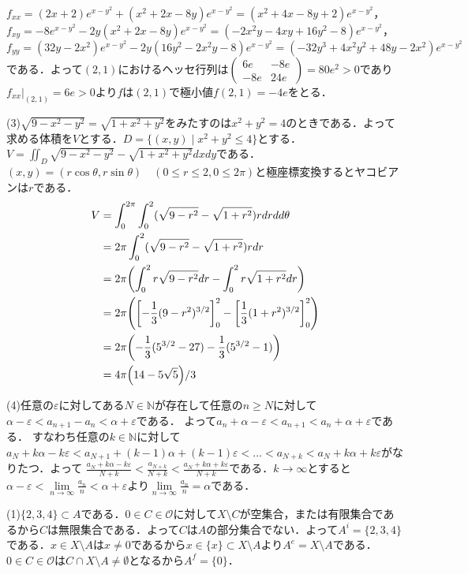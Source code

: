 \documentclass[
		book,
		head_space=20mm,
		foot_space=20mm,
		gutter=10mm,
		line_length=190mm
]{jlreq}
\begin{document}
$f_{xx}=(2x+2)e^{x-y^2}+(x^2+2x-8y)e^{x-y^2}=(x^2+4x-8y+2)e^{x-y^2}$，
$f_{xy}=-8e^{x-y^2}-2y(x^2+2x-8y)e^{x-y^2}=(-2x^2y-4xy+16y^2-8)e^{x-y^2}$，$f_{yy}=(32y-2x^2)e^{x-y^2}-2y(16y^2-2x^2y-8)e^{x-y^2}=(-32y^3+4x^2y^2+48y-2x^2)e^{x-y^2}$である．よって$(2,1)$におけるヘッセ行列は$\begin{pmatrix}
    6e & -8e \\
    -8e & 24e
\end{pmatrix}=80e^2>0$であり$f_{xx}|_{(2,1)}=6e>0$より$f$は$(2,1)$で極小値$f(2,1)=-4e$をとる．

(3)$\sqrt{9-x^2-y^2}=\sqrt{1+x^2+y^2}$をみたすのは$x^2+y^2=4$のときである．よって求める体積を$V$とする．$D=\{ (x,y) \mid x^2+y^2\le 4\}$とする．$V=\iint_D \sqrt{9-x^2-y^2}-\sqrt{1+x^2+y^2}dxdy$である．
$(x,y)=(r\cos \theta,r\sin\theta) \quad(0\le r \le 2,0\le 2\pi)$と極座標変換するとヤコビアンは$r$である．
\begin{align}
    V&=\int_0^{2\pi}\int_0^2 (\sqrt{9-r^2}-\sqrt{1+r^2})rdrdd\theta\\
    &=2\pi \int_0^2 (\sqrt{9-r^2}-\sqrt{1+r^2})rdr\\
    &=2\pi \qty( \int_0^2 r\sqrt{9-r^2}dr-\int_0^2 r\sqrt{1+r^2}dr)\\
    &=2\pi \qty( \qty[-\frac{1}{3}(9-r^2)^{3/2}]_0^2-\qty[\frac{1}{3}(1+r^2)^{3/2}]_0^2)\\
    &=2\pi \qty( -\frac{1}{3}(5^{3/2}-27)-\frac{1}{3}(5^{3/2}-1))\\
    &=4\pi \qty( 14-5\sqrt{5})/3
\end{align}

(4)任意の$\varepsilon$に対してある$N\in \mathbb{N}$が存在して任意の$n \ge N$に対して$\alpha-\varepsilon<a_{n+1}-a_n<\alpha+\varepsilon$である．
よって$a_n+\alpha-\varepsilon<a_{n+1}<a_n+\alpha+\varepsilon$である．
すなわち任意の$k\in \mathbb{N}$に対して
$a_{N}+k\alpha-k\varepsilon<a_{N+1}+(k-1)\alpha+(k-1)\varepsilon<\dots<a_{N+k}<a_{N}+k\alpha+k\varepsilon$がなりたつ．よって
$\frac{a_N+k\alpha-k\varepsilon}{N+k}<\frac{a_{N+k}}{N+k}<\frac{a_N+k\alpha+k\varepsilon}{N+k}$である．$k\rightarrow \infty$とすると$\alpha-\varepsilon<\lim\limits_{n\rightarrow \infty}\frac{a_n}{n}<\alpha+\varepsilon$より$\lim\limits_{n\rightarrow \infty}\frac{a_n}{n}=\alpha$である．

(1)$\{ 2,3,4\}\subset A$である．$0 \in C \in \mathcal{O}$に対して$X \setminus C$が空集合，または有限集合であるから$C$は無限集合である．よって$C$は$A$の部分集合でない．よって$A^i=\{ 2,3,4\}$である．$x \in X \setminus A$は$x \neq 0$であるから$x \in \{ x\} \subset X \setminus A$より$A^e=X \setminus A$である．$0 \in C \in \mathcal{O}$は$C \cap X \setminus A\neq \emptyset$となるから$A^f=\{ 0\}$．
\end{document}
